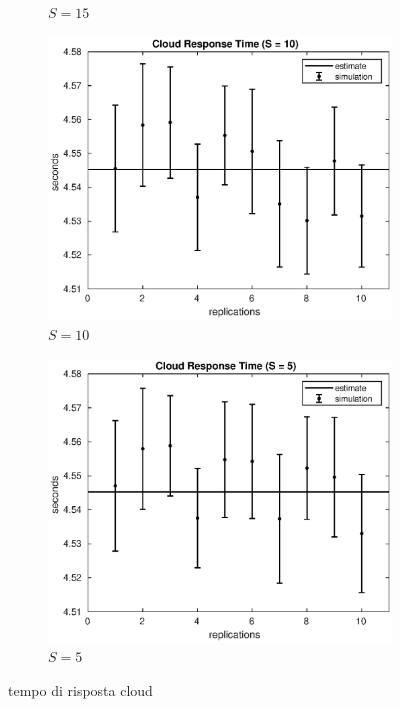 \begin{figure}[!h]
\begin{subfigure}[t]{0.49\textwidth}
\caption{$S = 15$}
\label{15_scloud}
\end{subfigure}
%
\begin{subfigure}[t]{0.49\textwidth}
\includegraphics[width=\textwidth]{figures/simul/10_500K_scloud}
\caption{$S = 10$}
\label{10_scloud}
\end{subfigure}
%
\begin{subfigure}[t]{0.49\textwidth}
\includegraphics[width=\textwidth]{figures/simul/5_500K_scloud}
\caption{$S = 5$}
\label{5_scloud}
\end{subfigure}
%
\caption{tempo di risposta cloud}
\label{plot:scloud}
\end{figure}
%
%

